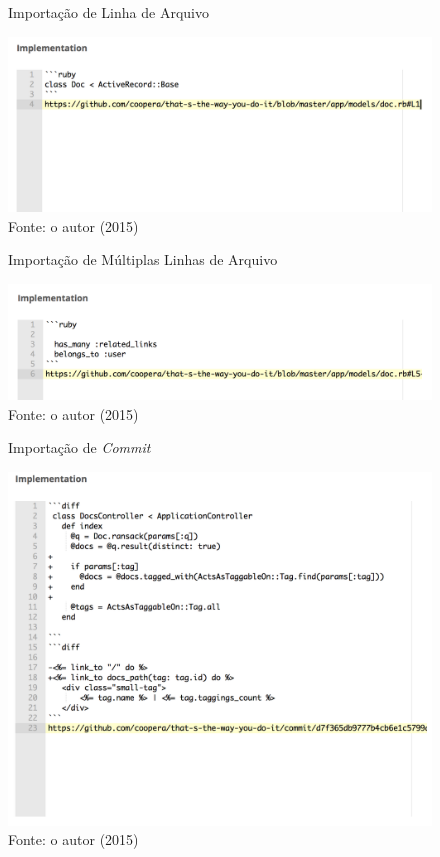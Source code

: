 \begin{figure}[h]
	\centering
    \caption{Importação de Linha de Arquivo}
    \includegraphics[width=15cm]{Imagens/import-line.png}
	\caption*{Fonte: o autor (2015)}
\end{figure}

\begin{figure}[h]
	\centering
    \caption{Importação de Múltiplas Linhas de Arquivo}
    \includegraphics[width=15cm]{Imagens/import-lines.png}
	\caption*{Fonte: o autor (2015)}
\end{figure}

\begin{figure}[h]
	\centering
    \caption{Importação de \textit{Commit}}
    \includegraphics[width=15cm]{Imagens/import-commit.png}
	\caption*{Fonte: o autor (2015)}
\end{figure}

